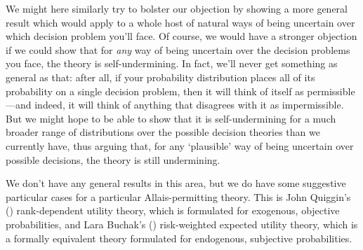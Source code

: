 \documentclass[a4paper]{article}
\newcommand{\todoold}[2][]{\todo[backgroundcolor=white,bordercolor=orange!10,linecolor=gray!10, #1,caption={},textcolor=gray]{Pre-rev: #2}}
\renewcommand{\color}[1]{}
\newenvironment{CCM rewritten}
{\begingroup\color{blue}} %
{\endgroup}              %
\begin{document}
We might here similarly try to bolster our objection by showing a more general result which would apply to a whole host of natural ways of being uncertain over which decision problem you'll face. 
Of course, we would have a stronger objection if we could show that for \emph{any} way of being uncertain over the decision problems you face, the theory is self-undermining. In fact, we'll never get something as general as that: after all, if your probability distribution places all of its probability on a single decision problem, then it will think of itself as permissible---and indeed, it will think of anything that disagrees with it as impermissible. But we might hope to be able to show that it is self-undermining for a much broader range of distributions over the possible decision theories than we currently have, thus arguing that, for any `plausible' way of being uncertain over possible decisions, the theory is still undermining. 


We don't have any general results in this area, but we do have some suggestive particular cases for a particular Allais-permitting theory. This is John Quiggin's (\citeyear{quiggin1982tau,quiggin1993geut}) rank-dependent utility theory, which is formulated for exogenous, objective probabilities, and Lara Buchak's (\citeyear{buchak2014rr}) risk-weighted expected utility theory, which is a formally equivalent theory formulated for endogenous, subjective probabilities.
\end{document}
